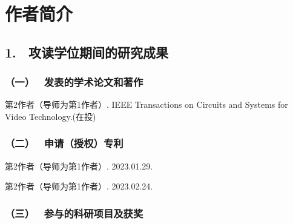 \specialsectioning


\chapter{作者简介}
\thispagestyle{others}
\pagestyle{others}
\xiaosi

\section{1. \ 攻读学位期间的研究成果}
\subsection{（一） \ 发表的学术论文和著作}
\noindent [1]
\begin{minipage}[t]{0.96\linewidth}
第2作者（导师为第1作者）. IEEE Transactions on Circuits and Systems for Video Technology.(在投)
\end{minipage}
\vspace{0cm}


\subsection{（二） \ 申请（授权）专利}
\noindent [1]
\begin{minipage}[t]{0.96\linewidth}
第2作者（导师为第1作者）. 2023.01.29.
\end{minipage}

\noindent [2]
\begin{minipage}[t]{0.96\linewidth}
第2作者（导师为第1作者）. 2023.02.24.
\end{minipage}

\subsection{（三） \ 参与的科研项目及获奖}
